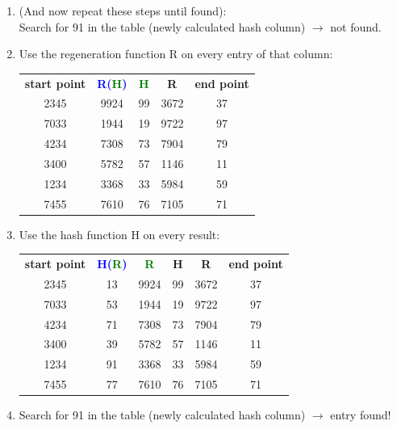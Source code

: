 \begin{enumerate}[(a)]
\begin{itemize}
\begin{enumerate}[1.]
\begin{enumerate}[{2}.1]
                    
                    \item (And now repeat these steps until found): 
                    \\ Search for 91 in the table (newly calculated hash column) $\rightarrow$ not found.
                    \item Use the regeneration function R on every entry of that column:
                    \\{%
                    \begin{tabular}{c c c c c}
                        \textbf{start point} & \textbf{\textcolor{blue}{R(\textcolor{green}{H})}} & \textbf{\textcolor{green}{H}} & \textbf{R} & \textbf{end point} \\
                        2345 & 9924 & 99 & 3672 & 37 \\
                        7033 & 1944 & 19 & 9722 & 97 \\
                        4234 & 7308 & 73 & 7904 & 79 \\
                        3400 & 5782 & 57 & 1146 & 11 \\
                        1234 & 3368 & 33 & 5984 & 59 \\
                        7455 & 7610 & 76 & 7105 & 71 
                    \end{tabular}
                    }
                    
                    \item Use the hash function H on every result:
                    \\{%
                    \begin{tabular}{c c c c c c}
                        \textbf{start point} & \textbf{\textcolor{blue}{H(\textcolor{green}{R})}} & \textbf{\textcolor{green}{R}} & \textbf{H} & \textbf{R} & \textbf{end point} \\
                        2345 & 13 & 9924 & 99 & 3672 & 37 \\
                        7033 & 53 & 1944 & 19 & 9722 & 97 \\
                        4234 & 71 & 7308 & 73 & 7904 & 79 \\
                        3400 & 39 & 5782 & 57 & 1146 & 11 \\
                        1234 & 91 & 3368 & 33 & 5984 & 59 \\
                        7455 & 77 & 7610 & 76 & 7105 & 71 
                    \end{tabular}
                    }
                    \item Search for 91 in the table (newly calculated hash column) $\rightarrow$ entry found!
                    
                    
                \end{enumerate}
        \end{enumerate} 
    \end{itemize}
\end{enumerate}

